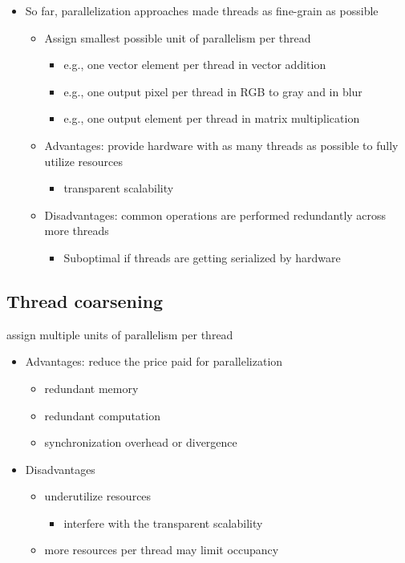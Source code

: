 \documentclass{article}
\begin{document}
\begin{itemize}
\item So far, parallelization approaches made threads as fine-grain as possible
\begin{itemize}
\item Assign smallest possible unit of parallelism per thread
\begin{itemize}
\item e.g., one vector element per thread in vector addition
\item e.g., one output pixel per thread in RGB to gray and in blur
\item e.g., one output element per thread in matrix multiplication
\end{itemize}
\item Advantages: provide hardware with as many threads as possible to fully utilize resources
\begin{itemize}
\item transparent scalability
\end{itemize}
\item Disadvantages: common operations are performed redundantly across more threads
\begin{itemize}
\item Suboptimal if threads are getting serialized by hardware
\end{itemize}
\end{itemize}
\end{itemize}
\subsection{Thread coarsening}
assign multiple units of parallelism per thread
\begin{itemize}
\item Advantages: reduce the price paid for parallelization
\begin{itemize}
\item redundant memory
\item redundant computation
\item synchronization overhead or divergence
\end{itemize}
\item Disadvantages
\begin{itemize}
\item underutilize resources
\begin{itemize}
\item interfere with the transparent scalability
\end{itemize}
\item more resources per thread may limit occupancy
\end{itemize}
\end{itemize}
\end{document}
